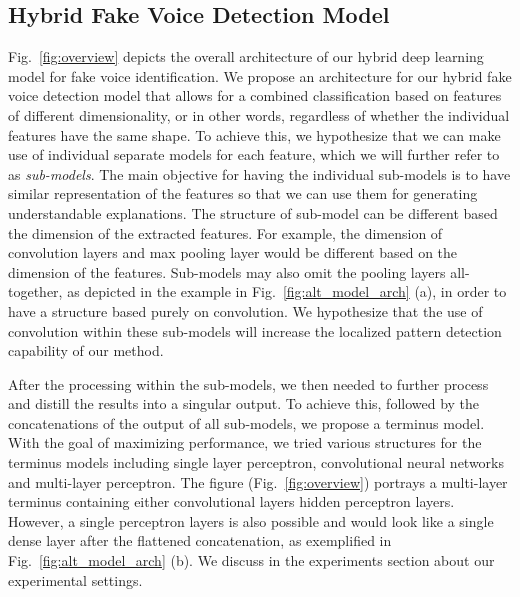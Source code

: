 \documentclass{article}
\begin{document}
\subsection{Hybrid Fake Voice Detection Model}

Fig.~\ref{fig:overview} depicts the overall architecture of our hybrid deep learning model for fake voice identification. We propose an architecture for our hybrid fake voice detection model that allows for a combined classification based on features of different dimensionality, or in other words, regardless of whether the individual features have the same shape. To achieve this, we hypothesize that we can make use of individual separate models for each feature, which we will further refer to as \textit{sub-models}. The main objective for having the individual sub-models is to have similar representation of the features so that we can use them for generating understandable explanations. The structure of sub-model can be different based the dimension of the extracted features. For example, the dimension of convolution layers and max pooling layer would be different based on the dimension of the features. Sub-models may also omit the pooling layers all-together, as depicted in the example in Fig.~\ref{fig:alt_model_arch} (a), in order to have a structure based purely on convolution. We hypothesize that the use of convolution within these sub-models will increase the localized pattern detection capability of our method.

After the processing within the sub-models, we then needed to further process and distill the results into a singular output. To achieve this, followed by the concatenations of the output of all sub-models, we propose a terminus model. With the goal of maximizing performance, we tried various structures for the terminus models including single layer perceptron, convolutional neural networks and multi-layer perceptron. The figure (Fig.~\ref{fig:overview}) portrays a multi-layer terminus containing either convolutional layers hidden perceptron layers. However, a single perceptron layers is also possible and would look like a single dense layer after the flattened concatenation, as exemplified in Fig.~\ref{fig:alt_model_arch} (b). We discuss in the experiments section about our experimental settings.
\end{document}
